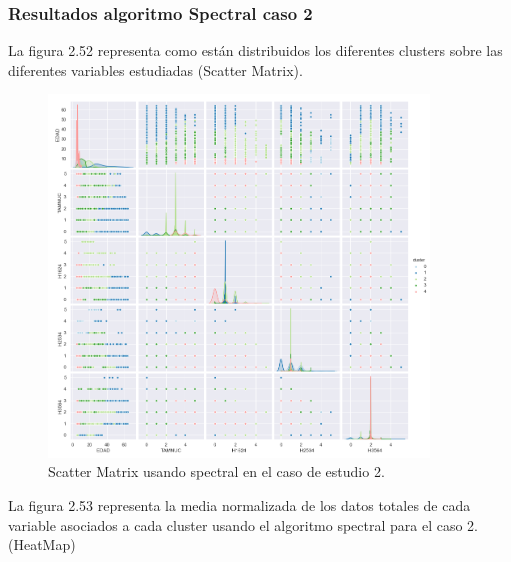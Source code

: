 
	\subsubsection{Resultados algoritmo Spectral caso 2}


	La figura 2.52 representa como están distribuidos los diferentes clusters sobre las diferentes variables estudiadas
	(Scatter Matrix).\\

	\begin{figure}[htb]
		\centering
		\includegraphics[width=0.9\textwidth]{./imagenes/caso2/scatterMatrix_caso2_spectral}
		\caption{Scatter Matrix usando spectral en el caso de estudio 2.} \label{fig:1}
	\end{figure}

	La figura 2.53 representa la media normalizada de los datos totales de cada variable asociados
	a cada cluster usando el algoritmo spectral para el caso 2. (HeatMap) \\

